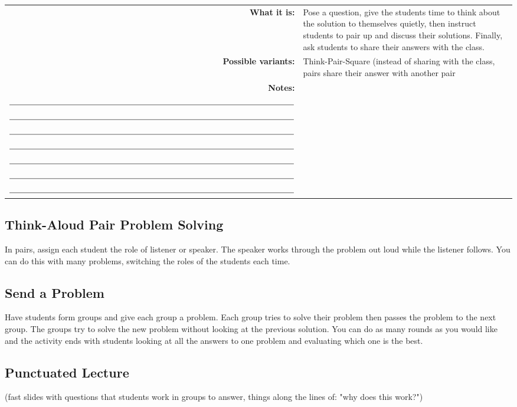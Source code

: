 \begin{center}
  \begin{tabular}{rp{4in}}
    \textbf{What it is:}& Pose a question, give the students time to think about the solution to themselves quietly, then instruct students to pair up and discuss their solutions. Finally, ask students to share their answers with the class.\\
    \textbf{Possible variants:}&Think-Pair-Square (instead of sharing with the class, pairs share their answer with another pair\\
    \textbf{Notes:}& 
    \begin{minipage}{0.8\textwidth}
      \vspace{0.5cm}
      $\rule{\textwidth}{0.15mm}$\\
      $\rule{\textwidth}{0.15mm}$\\
      $\rule{\textwidth}{0.15mm}$\\
      $\rule{\textwidth}{0.15mm}$\\
      $\rule{\textwidth}{0.15mm}$\\
      $\rule{\textwidth}{0.15mm}$\\
      $\rule{\textwidth}{0.15mm}$\\
      $\rule{\textwidth}{0.15mm}$
    \end{minipage}
    \\
  \end{tabular}
\end{center}

\subsection*{Think-Aloud Pair Problem Solving}
In pairs, assign each student the role of listener or speaker. The speaker works through the problem out loud while the listener follows. You can do this with many problems, switching the roles of the students each time. 
\subsection*{Send a Problem}
Have students form groups and give each group a problem. Each group tries to solve their problem then passes the problem to the next group. The groups try to solve the new problem without looking at the previous solution. You can do as many rounds as you would like and the activity ends with students looking at all the answers to one problem and evaluating which one is the best. 
\subsection*{Punctuated Lecture}
(fast slides with questions that students work in groups to 
answer, things along the lines of: "why does this work?")
